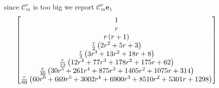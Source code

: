 since $\mathcal{C}_{m}^{r}$ is too big we report $\mathcal{C}_{m}^{r}\boldsymbol{e}_{1}$ 
\begin{displaymath}
\hspace{-1.5cm}
\left[\begin{matrix}1 \\r \\r \left(r + 1\right) \\\frac{r}{2} \left(2 r^{2} + 5 r + 3\right) \\\frac{r}{3} \left(3 r^{3} + 13 r^{2} + 18 r + 8\right) \\\frac{r}{12} \left(12 r^{4} + 77 r^{3} + 178 r^{2} + 175 r + 62\right) \\\frac{r}{30} \left(30 r^{5} + 261 r^{4} + 875 r^{3} + 1405 r^{2} + 1075 r + 314\right) \\\frac{r}{60} \left(60 r^{6} + 669 r^{5} + 3002 r^{4} + 6900 r^{3} + 8510 r^{2} + 5301 r + 1298\right) \end{matrix}\right]
\end{displaymath}
